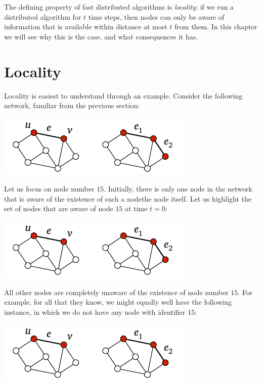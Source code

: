 
The defining property of fast distributed algorithms is \emph{locality}: if we run a distributed algorithm for $t$ time steps, then nodes can only be aware of information that is available within distance at most $t$ from them. In this chapter we will see why this is the case, and what consequences it has.

\section{Locality}

Locality is easiest to understand through an example. Consider the following network, familiar from the previous section:
\begin{center}
    \includegraphics[page=\PIntroId]{figs.pdf}
\end{center}
Let us focus on node number $15$. Initially, there is only one node in the network that is aware of the existence of such a node\mydash the node itself. Let us highlight the set of nodes that are aware of node $15$ at time {\boldmath $t = 0$}:
\begin{center}
    \includegraphics[page=\PIntroTA]{figs.pdf}
\end{center}
All other nodes are completely unaware of the existence of node number $15$. For example, for all that they know, we might equally well have the following instance, in which we do not have any node with identifier $15$:
\begin{center}
    \includegraphics[page=\PIntroIdX]{figs.pdf}
\end{center}

